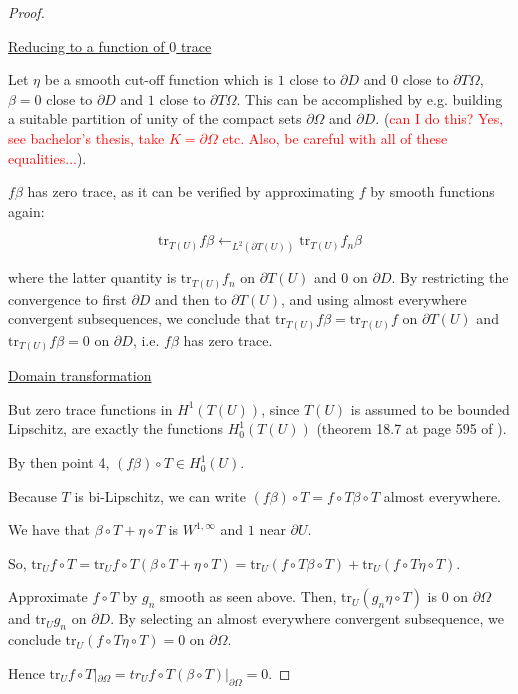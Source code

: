 \documentclass[english,a4paper,12pt,oneside]{scrbook}
\theoremstyle{break}
\newenvironment{mproof}[1][\proofname]{%
  \begin{proof}[#1]$ $\par\nobreak\ignorespaces
}{%
  \end{proof}
}
\renewcommand*{\proofname}{Proof}
\theoremstyle{remark}
\newcommand{\tr}{\text{tr}}
\begin{document}
\begin{mproof}
\underline{Reducing to a function of $0$ trace}

Let $\eta$ be a smooth cut-off function which is $1$ close to $\partial D$ and $0$ close to $\partial T\Omega$, $\beta=0$ close to $\partial D$ and $1$ close to $\partial T\Omega$. This can be accomplished by e.g. building a suitable partition of unity of the compact sets $\partial \Omega$ and $\partial D$. (\textcolor{red}{can I do this? Yes, see bachelor's thesis, take $K =\partial \Omega$ etc. Also, be careful with all of these equalities...}).


$f\beta$ has zero trace, as it can be verified by approximating $f$ by smooth functions again: 

$$\tr_{T(U)} f\beta \leftarrow_{L^2(\partial T(U))} \tr_{T(U)} f_n \beta $$

where the latter quantity is $\tr_{T(U)} f_n $ on $\partial T(U)$ and $0$ on $\partial D$. By restricting the convergence  to first $\partial D$ and then to $\partial T(U)$, and using almost everywhere convergent subsequences, we conclude that $\tr_{T(U)} f \beta = \tr_{T(U)} f $ on $\partial T(U)$ and  $\tr_{T(U)} f \beta = 0 $ on $\partial D$, i.e.  $f\beta$ has zero trace.

%

\underline{Domain transformation}

But zero trace functions in $H^1(T(U))$, since $T(U)$ is assumed to be bounded Lipschitz, are exactly the functions $H^1_0(T(U))$ (theorem 18.7 at page 595 of \cite{leoni}).

By then point 4, $(f\beta)\circ T \in H^1_0(U)$.

Because $T$ is bi-Lipschitz, we can write $(f\beta)\circ T = f \circ T \beta \circ T$ almost everywhere.

We have that $\beta \circ T +  \eta \circ T$ is $W^{1,\infty}$ and $1$ near $\partial U$. 

So, $\tr_U f\circ T = \tr_U f\circ T(\beta \circ T +  \eta \circ T) = \tr_U (f\circ T\beta \circ T) + \tr_U (f\circ T  \eta \circ T)$.

Approximate $f\circ T$ by $g_n$ smooth as seen above.  Then, $\tr_U (g_n \eta \circ T)$ is $0$ on $\partial \Omega$ and $\tr_U g_n$ on $\partial D$. By selecting an almost everywhere convergent subsequence, we conclude $\tr_U (f\circ T \eta \circ T) = 0$ on $\partial \Omega$. 

Hence  $\tr_U f\circ T|_{\partial \Omega} = tr_U f\circ T(\beta \circ T)|_{\partial \Omega} = 0$.

\end{mproof}
\end{document}
